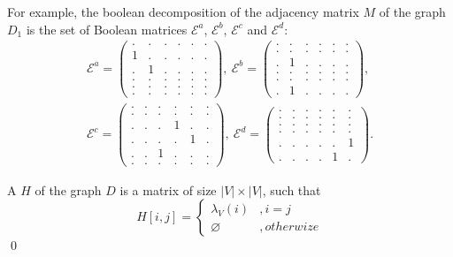 For example, the boolean decomposition of the adjacency matrix $M$ of the graph $D_1$ is the set of Boolean matrices $\mathcal{E}^a$, $\mathcal{E}^b$, $\mathcal{E}^c$ and $\mathcal{E}^d$:
{
    \renewcommand{\arraystretch}{0.7}
    \setlength\arraycolsep{2pt}
\begin{align*}
\mathcal{E}^a =
\begin{pmatrix}
    . & . & . & . & . & . \\
    1 & . & . & . & . & . \\
    . & 1 & . & . & . & . \\
    . & . & . & . & . & . \\
    . & . & . & . & . & . \\
    . & . & . & . & . & .
\end{pmatrix},~
\mathcal{E}^b =
\begin{pmatrix}
    . & . & . & . & . & . \\
    . & . & . & . & . & . \\
    . & 1 & . & . & . & . \\
    . & . & . & . & . & . \\
    . & . & . & . & . & . \\
    . & 1 & . & . & . & .
\end{pmatrix},\\
\mathcal{E}^c =
\begin{pmatrix}
    . & . & . & . & . & . \\
    . & . & . & . & . & . \\
    . & . & . & 1 & . & . \\
    . & . & . & . & 1 & . \\
    . & . & 1 & . & . & . \\
    . & . & . & . & . & .
\end{pmatrix},~
\mathcal{E}^d =
\begin{pmatrix}
    . & . & . & . & . & . \\
    . & . & . & . & . & . \\
    . & . & . & . & . & . \\
    . & . & . & . & . & . \\
    . & . & . & . & . & 1 \\
    . & . & . & . & 1 & .
\end{pmatrix}.
\end{align*}
}

\begin{definition}

A  $H$ of the graph $D$ is a matrix of size $|V|\times|V|$, such that
\begin{equation*}
H[i,j] =
  \begin{cases}
    \lambda_V (i) &, i = j \\
    \varnothing   &, otherwize
  \end{cases}
\end{equation*} \qed
\end{definition}

